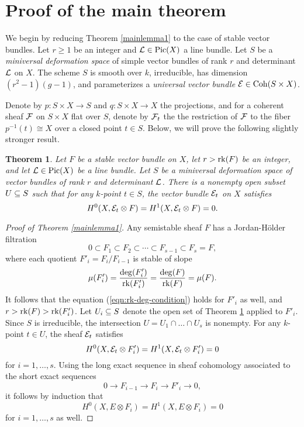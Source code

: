 \documentclass[letterpaper,12pt]{amsart}
\newtheorem{thm}{Theorem}[section]
\theoremstyle{remark}
\begin{document}
\section{Proof of the main theorem}
We begin by reducing Theorem \ref{mainlemma1} to the case of stable vector bundles. Let $r \ge 1$ be an integer and $\mathcal{L} \in \mathrm{Pic}(X)$ a line bundle. Let $S$ be a \textit{miniversal deformation space} of simple vector bundles of rank $r$ and determinant $\mathcal{L}$ on $X$. The scheme $S$ is smooth over $k$, irreducible, has dimension $(r^2 - 1)(g - 1)$, and parameterizes a \textit{universal vector bundle} $\mathcal{E} \in \mathrm{Coh}(S \times X)$. 
\begin{center}
\end{center}
Denote by $p: S \times X \to S$ and $q: S \times X \to X$ the projections, and for a coherent sheaf $\mathcal{F}$ on $S \times X$ flat over $S$, denote by $\mathcal{F}_t$ the the restriction of $\mathcal{F}$ to the fiber $p^{-1}(t) \cong X$ over a closed point $t \in S$. Below, we will prove the following slightly stronger result.
\begin{thm}\label{mainlemmastable}
    Let $F$ be a stable vector bundle on $X$, let $r > \operatorname{\mathrm{rk}}(F)$ be an integer, and let $\mathcal{L} \in \mathrm{Pic}(X)$ be a line bundle. Let $S$ be a miniversal deformation space of vector bundles of rank $r$ and determinant $\mathcal{L}$. There is a nonempty open subset $U \subseteq S$ such that for any $k$-point $t \in S$, the vector bundle $\mathcal{E}_t$ on $X$ satisfies
    \[ H^0(X, \mathcal{E}_t \otimes F) = H^1(X, \mathcal{E}_t \otimes F) = 0. \]
\end{thm}

\begin{proof}[Proof of Theorem \ref{mainlemma1}]
    Any semistable sheaf $F$ has a Jordan-H\"older filtration
    \[ 0 \subset F_1 \subset F_2 \subset \cdots \subset F_{s-1} \subset F_s = F, \]
    where each quotient $F'_i = F_i/F_{i-1}$ is stable of slope
    \[ \mu(F'_i) = \frac{\deg(F'_i)}{\operatorname{\mathrm{rk}}(F'_i)} = \frac{\deg(F)}{\operatorname{\mathrm{rk}}(F)} = \mu(F). \]
    It follows that the equation (\ref{eqn:rk-deg-condition}) holds for $F'_i$ as well, and $r > \operatorname{\mathrm{rk}}(F) > \operatorname{\mathrm{rk}}(F'_i)$. Let $U_i \subseteq S$ denote the open set of Theorem \ref{mainlemmastable} applied to $F'_i$. Since $S$ is irreducible, the intersection $U = U_1 \cap \ldots \cap U_s$ is nonempty. For any $k$-point $t \in U$, the sheaf $\mathcal{E}_t$ satisfies
    \[ H^0(X, \mathcal{E}_t \otimes F'_i) = H^1(X, \mathcal{E}_t \otimes F'_i) = 0 \]
    for $i = 1, \ldots, s$. Using the long exact sequence in sheaf cohomology associated to the short exact sequences
    \[ 0 \to F_{i-1} \to F_i \to F'_i \to 0, \]
    it follows by induction that 
    \[ H^0(X, E \otimes F_i) = H^1(X, E \otimes F_i) = 0 \]
    for $i = 1, \ldots, s$ as well.
\end{proof}
\end{document}
